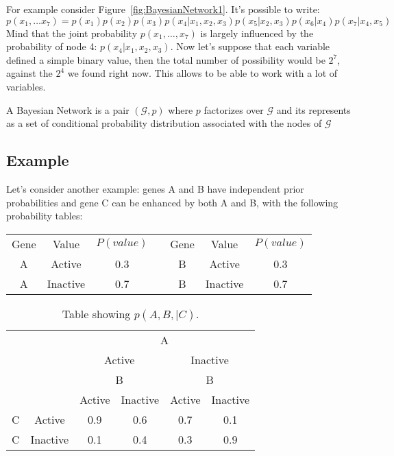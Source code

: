 \noindent For example consider Figure~\ref{fig:BayesianNetwork1}. It's possible to write:
\[
	p(x_1,\hdots x_7)=p(x_1)p(x_2)p(x_3)p(x_4\vert x_1,x_2,x_3)p(x_5\vert x_2,x_3)p(x_6\vert x_4)p(x_7\vert x_4,x_5)
\]
Mind that the joint probability $p(x_1, \hdots, x_7)$ is largely influenced by the probability of node 4: $p(x_4\vert x_1, x_2, x_3)$. Now let's suppose that each variable defined a simple binary value, then the total number of possibility would be $2^7$, against the $2^4$ we found right now. This allows to be able to work with a lot of variables. \newline
\begin{definition}
A Bayesian Network is a pair $(\mathcal{G}, p)$ where $p$ factorizes over $\mathcal{G}$ and its represents as a set of conditional probability distribution associated with the nodes of $\mathcal{G}$
\end{definition}
%
%
\subsection{Example}%
Let's consider another example: genes A and B have independent prior probabilities and gene C can be enhanced by both A and B, with the following probability tables:
\begin{center}
	\begin{tabular}{c|c|cp{2cm}c|c|c}
		Gene&Value&$P(value)$&&Gene&Value&$P(value)$\\
		\cline{1-3}\cline{5-7}
		A&Active&0.3&&B&Active&0.3\\
		A&Inactive&0.7&&B&Inactive&0.7\\
	\end{tabular}
\end{center}
\begin{table}[!h]
	\centering
	\begin{tabular}{cc|cc|cc}
		\multicolumn{2}{c|}{}&\multicolumn{4}{c}{A}\\
		\multicolumn{2}{c|}{}&\multicolumn{2}{c}{Active}&\multicolumn{2}{c}{Inactive}\\
		\hline
		\multicolumn{2}{c|}{}&\multicolumn{2}{c|}{B}&\multicolumn{2}{c}{B}\\
		\multicolumn{2}{c|}{}&Active&Inactive&Active&Inactive\\
		\hline
		C&Active&0.9&0.6&0.7&0.1\\
		C&Inactive&0.1&0.4&0.3&0.9
	\end{tabular}
	\caption{Table showing $p(A,B,\vert C)$.}
\end{table}
%
%
